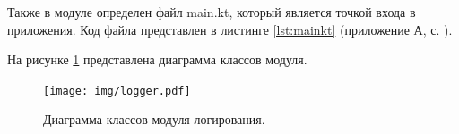 Также в модуле определен файл main.kt, который является точкой входа в приложения. Код файла представлен в листинге \ref{lst:mainkt} (приложение А, с. \pageref{chp:application-a}).

На рисунке \ref{fig:loggingUml} представлена диаграмма классов модуля.
\begin{figure}[H]
	\centering
	\texttt{[image: img/logger.pdf]}
	\caption{Диаграмма классов модуля логирования.}
	\label{fig:loggingUml}
\end{figure}


